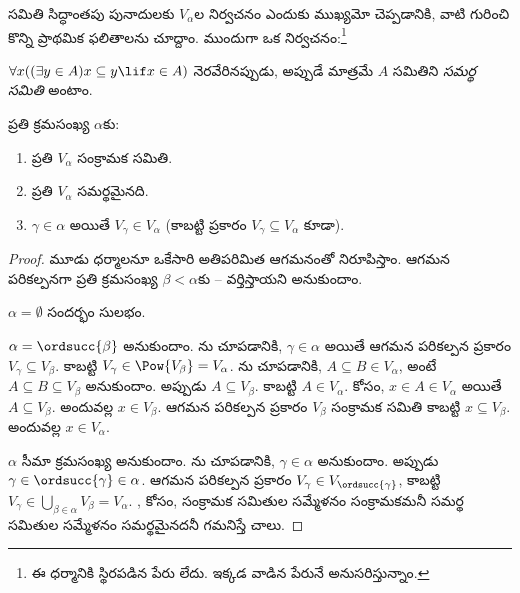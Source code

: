 \documentclass[../../../include/open-logic-section]{subfiles}
\begin{document}

సమితి సిద్ధాంతపు పునాదులకు $V_\alpha$ల నిర్వచనం ఎందుకు
ముఖ్యమో చెప్పడానికి, వాటి గురించి కొన్ని ప్రాథమిక
ఫలితాలను చూద్దాం. ముందుగా ఒక నిర్వచనం:\footnote{ఈ ధర్మానికి
స్థిరపడిన పేరు లేదు. ఇక్కడ \citet{ButtonLT1} వాడిన పేరునే అనుసరిస్తున్నాం.}
\begin{defn}
	$\forall x((\exists y \in A)x \subseteq y \lif x \in A)$ నెరవేరినప్పుడు,
	అప్పుడే మాత్రమే $A$ సమితిని \emph{సమర్థ సమితి} అంటాం.
\end{defn}
\begin{lem}
ప్రతి క్రమసంఖ్య $\alpha$కు:
\begin{enumerate}
	\item{} ప్రతి $V_\alpha$ సంక్రామక సమితి.
	\item{} ప్రతి $V_\alpha$ సమర్థమైనది.
	\item{} $\gamma \in \alpha$ అయితే $V_\gamma
	\in V_\alpha$ (కాబట్టి  ప్రకారం $V_\gamma \subseteq V_\alpha$ కూడా).
\end{enumerate}
\end{lem}

\begin{proof}
మూడు ధర్మాలనూ ఒకేసారి అతిపరిమిత ఆగమనంతో నిరూపిస్తాం.
ఆగమన పరికల్పనగా ప్రతి క్రమసంఖ్య $\beta < \alpha$కు
-- వర్తిస్తాయని అనుకుందాం.

$\alpha = \emptyset$ సందర్భం సులభం.

$\alpha = \ordsucc{\beta}$ అనుకుందాం.
ను చూపడానికి, $\gamma \in \alpha$ అయితే
ఆగమన పరికల్పన ప్రకారం $V_\gamma \subseteq V_\beta$.
కాబట్టి $V_\gamma \in \Pow{V_\beta} = V_\alpha$.
ను చూపడానికి, $A \subseteq B \in V_\alpha$,
అంటే $A \subseteq B \subseteq V_\beta$ అనుకుందాం. అప్పుడు
$A \subseteq V_\beta$. కాబట్టి $A \in V_\alpha$.
 కోసం, $x \in A \in V_\alpha$ అయితే
$A \subseteq V_\beta$. అందువల్ల $x \in V_\beta$.
ఆగమన పరికల్పన ప్రకారం $V_\beta$ సంక్రామక సమితి కాబట్టి
$x \subseteq V_\beta$. అందువల్ల $x \in V_\alpha$.

$\alpha$ సీమా క్రమసంఖ్య అనుకుందాం. ను
చూపడానికి, $\gamma \in \alpha$ అనుకుందాం. అప్పుడు
$\gamma \in \ordsucc{\gamma} \in \alpha$. ఆగమన పరికల్పన
ప్రకారం $V_\gamma \in V_{\ordsucc{\gamma}}$, కాబట్టి
$V_\gamma \in \bigcup_{\beta \in \alpha} V_\beta = V_\alpha$.
,  కోసం, సంక్రామక
సమితుల సమ్మేళనం సంక్రామకమనీ సమర్థ సమితుల సమ్మేళనం
సమర్థమైనదనీ గమనిస్తే చాలు.
\end{proof}
\end{document}
